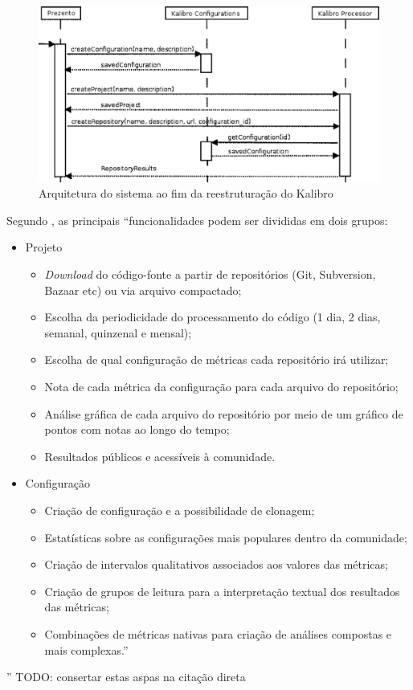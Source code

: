 \begin{figure}[!htb]
	\centering
    \includegraphics[keepaspectratio=true,scale=0.5]
    {figuras/processingSeqDiag.eps}
  \caption{Arquitetura do sistema ao fim da reestruturação do Kalibro
  \cite{meirellesCibse2015}}
	\label{fig:processingSeqDiag}
\end{figure}

\newpage

Segundo , as principais ``funcionalidades podem ser
divididas em dois grupos:

\begin{itemize}
  \item Projeto
    \begin{itemize}
    \item \textit{Download} do código-fonte a partir de repositórios (Git,
    Subversion, Bazaar etc) ou via arquivo compactado;
        \item Escolha da periodicidade do processamento do código (1 dia, 2 dias,
        semanal, quinzenal e mensal);
        \item Escolha de qual configuração de métricas cada repositório irá
        utilizar;
        \item Nota de cada métrica da configuração para cada arquivo do
        repositório;
        \item Análise gráfica de cada arquivo do repositório por meio de um
        gráfico de pontos com notas ao longo do tempo;
        \item Resultados públicos e acessíveis à comunidade.
    \end{itemize}
    \item Configuração
    \begin{itemize}
    \item Criação de configuração e a possibilidade de clonagem;
        \item Estatísticas sobre as configurações mais populares dentro da
        comunidade;
        \item Criação de intervalos qualitativos associados aos valores das
        métricas;
        \item Criação de grupos de leitura para a interpretação textual dos
        resultados das métricas;
        \item Combinações de métricas nativas para criação de análises compostas
        e mais complexas.''
    \end{itemize}
\end{itemize}
''
TODO: consertar estas aspas na citação direta

